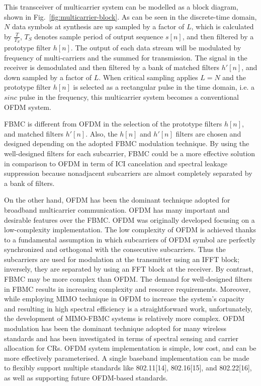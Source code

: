 \documentclass{article}
\begin{document}
This transceiver of multicarrier system can be modelled as a block diagram, shown in Fig.~\ref{fig:multicarrier-block}.
As can be seen in the discrete-time domain, $N$ data symbols at synthesis are up sampled by a factor of $L$, which is calculated by $\frac{T}{T_{S}}$, $T_{S}$ denotes sample period of output sequence $s[n]$, and then filtered by a prototype filter $h[n]$. The output of each data stream will be modulated by frequency of multi-carriers and the summed for transmission. 
The signal in the receiver is demodulated and then filtered by a bank of matched filters $h'[n]$, and down sampled by a factor of $L$. 
When critical sampling applies $L = N$ and the prototype filter $h[n]$ is selected as a rectangular pulse in the time domain, i.e. a $sinc$ pulse in the frequency, this multicarrier system becomes a conventional OFDM system.

FBMC is different from OFDM in the selection of the prototype filters $h[n]$, and matched filters $h'[n]$. Also, the $h[n]$ and $h'[n]$ filters are chosen and designed depending on the adopted FBMC modulation technique.
By using the well-designed filters for each subcarrier, FBMC could be a more effective solution in comparison to OFDM in term of ICI cancelation and spectral leakage suppression because nonadjacent subcarriers are almost completely separated by a bank of filters. 

On the other hand, OFDM has been the dominant technique adopted for broadband multicarrier communication.
OFDM has many important and desirable features over the FBMC. OFDM was originally developed focusing on a low-complexity implementation. The low complexity of OFDM is achieved thanks to a fundamental assumption in which subcarriers of OFDM symbol are perfectly synchronized and orthogonal with the consecutive subcarriers. Thus the subcarriers are used for modulation at the transmitter using an IFFT block; inversely, they are separated by using an FFT block at the receiver. By contrast, FBMC may be more complex than OFDM. The demand for well-designed filters in FBMC results in increasing complexity and resource requirements. Moreover, while employing MIMO technique in OFDM to increase the system's capacity and resulting in high spectral efficiency is a straightforward work, unfortunately, the development of MIMO-FBMC systems is relatively more complex.
OFDM modulation has been the dominant technique adopted for many wireless standards and has been investigated in terms of spectral sensing and carrier allocation for CRs.
OFDM system implementation is simple, low cost, and can be more effectively parameterised.
A single baseband implementation can be made to flexibly support multiple standards like 802.11[14], 802.16[15], and 802.22[16], as well as supporting future OFDM-based standards.
\end{document}
